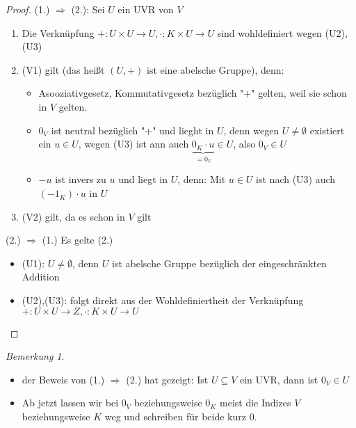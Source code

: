 \documentclass[a4paper]{scrartcl}
\theoremstyle{definition}
\theoremstyle{plain}
\theoremstyle{plain}
\theoremstyle{remark}
\newtheorem{remark}{Bemerkung}
\theoremstyle{remark}
\theoremstyle{remark}
\begin{document}
\begin{proof}
(1.) $\Rightarrow$ (2.): Sei $U$ ein UVR von $V$ \\
\begin{enumerate}
\item Die Verknüpfung $+:U\times U\to U, \cdot :K\times U \to U$ sind wohldefiniert wegen (U2), (U3)
\item (V1) gilt (das heißt $(U,+)$ ist eine abelsche Gruppe), denn:
\begin{itemize}
\item Asooziativgesetz, Kommutativgesetz bezüglich "$+$" gelten, weil sie schon in $V$ gelten.
\item $0_V$ ist neutral bezüglich "$+$" und lieght in $U$, denn wegen $U \neq \emptyset$ existiert ein $u\in U$, wegen (U3) ist ann auch $\underbrace{0_K \cdot u}_{= 0_V} \in U$, also $0_V \in U$
\item $-u$ ist invers zu $u$ und liegt in $U$, denn: Mit $u \in U$ ist nach (U3) auch $(-1_K)\cdot u$ in $U$
\end{itemize}
\item (V2) gilt, da es schon in $V$ gilt
\end{enumerate}
(2.) $\Rightarrow$ (1.) Es gelte (2.) \\
\begin{itemize}
\item (U1): $U\neq \emptyset$, denn $U$ ist abelsche Gruppe bezüglich der eingeschränkten Addition
\item (U2),(U3): folgt direkt aus der Wohldefiniertheit der Verknüpfung $+: U\times U \to Z, \cdot : K\times U \to U$
\end{itemize}
\end{proof}
\begin{remark}
\begin{itemize}
\item der Beweis von (1.) $\Rightarrow$ (2.) hat gezeigt: Ist $U \subseteq V$ ein UVR, dann ist $0_V \in U$
\item Ab jetzt lassen wir bei $0_V$ beziehungsweise $0_K$ meist die Indizes $V$ beziehungsweise $K$ weg und schreiben für beide kurz $0$.
\end{itemize}
\end{remark}
\end{document}
